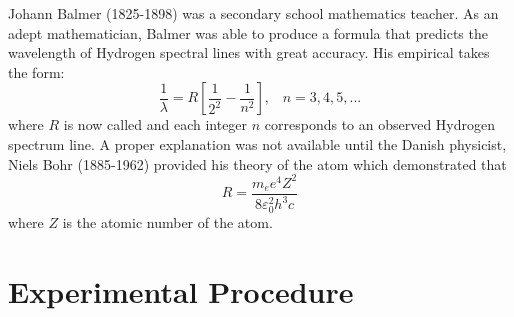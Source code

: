 \documentclass[12pt, a4paper, oneside, openright, titlepage]{book}
\begin{document}
\noindent Johann Balmer (1825-1898) was a secondary school mathematics teacher. As an adept mathematician, Balmer was able to produce a formula that predicts the wavelength of Hydrogen spectral lines with great accuracy. His empirical  takes the form: \begin{equation}\label{eq:SPEC2}
    \frac{1}{\lambda} = R\left[\frac{1}{2^2} - \frac{1}{n^2}\right],\;\;\;n=3,4,5,...
\end{equation}
where $R$ is now called  and each integer $n$ corresponds to an observed Hydrogen spectrum line. A proper explanation was not available until the Danish physicist, Niels Bohr (1885-1962) provided his theory of the atom which demonstrated that \begin{equation}\label{eq:SPEC3}
    R = \frac{m_ee^4Z^2}{8\varepsilon_0^2h^3c}
\end{equation}
where $Z$ is the atomic number of the atom.

\section{Experimental Procedure}
\end{document}
